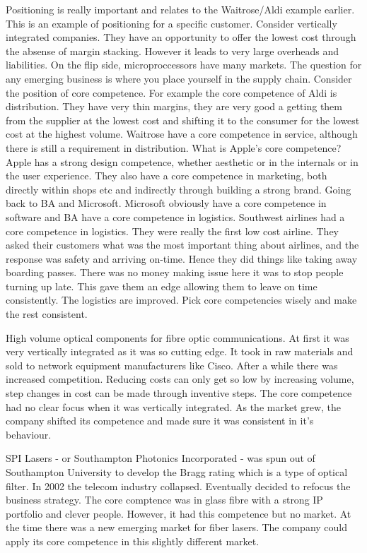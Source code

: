 Positioning is really important and relates to the Waitrose/Aldi example earlier. This is an example of positioning for a specific customer. Consider vertically integrated companies. They have an opportunity to offer the lowest cost through the absense of margin stacking. However it leads to very large overheads and liabilities. On the flip side, microproccessors have many markets. The question for any emerging business is where you place yourself in the supply chain. Consider the position of core competence. For example the core competence of Aldi is distribution. They have very thin margins, they are very good a getting them from the supplier at the lowest cost and shifting it to the consumer for the lowest cost at the highest volume. Waitrose have a core competence in service, although there is still a requirement in distribution. What is Apple's core competence? Apple has a strong design competence, whether aesthetic or in the internals or in the user experience. They also have a core competence in marketing, both directly within shops etc and indirectly through building a strong brand. Going back to BA and Microsoft. Microsoft obviously have a core competence in software and BA have a core competence in logistics. Southwest airlines had a core competence in logistics. They were really the first low cost airline. They asked their customers what was the most important thing about airlines, and the response was safety and arriving on-time. Hence they did things like taking away boarding passes. There was no money making issue here it was to stop people turning up late. This gave them an edge allowing them to leave on time consistently. The logistics are improved. Pick core competencies wisely and make the rest consistent.

High volume optical components for fibre optic communications. At first it was very vertically integrated as it was so cutting edge. It took in raw materials and sold to network equipment manufacturers like Cisco. After a while there was increased competition. Reducing costs can only get so low by increasing volume, step changes in cost can be made through inventive steps. The core competence had no clear focus when it was vertically integrated. As the market grew, the company shifted its competence and made sure it was consistent in it's behaviour. 

SPI Lasers - or Southampton Photonics Incorporated - was spun out of Southampton University to develop the Bragg rating which is a type of optical filter. In 2002 the telecom industry collapsed. Eventually decided to refocus the business strategy. The core comptence was in glass fibre with a strong IP portfolio and clever people. However, it had this competence but no market. At the time there was a new emerging market for fiber lasers. The company could apply its core competence in this slightly different market.

